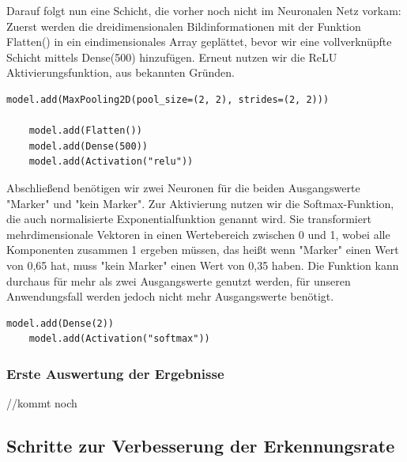 \documentclass[conference]{IEEEtran}
\begin{document}
	Darauf folgt nun eine Schicht, die vorher noch nicht im Neuronalen Netz vorkam:
	Zuerst werden die dreidimensionalen Bildinformationen mit der Funktion Flatten() in ein eindimensionales Array geplättet, bevor wir eine vollverknüpfte Schicht mittels Dense(500) hinzufügen.
	Erneut nutzen wir die ReLU Aktivierungsfunktion, aus bekannten Gründen.
	
	\begin{lstlisting}[label={list:model_1_3},caption=Modell: vierte und fünfte Schicht]
	model.add(MaxPooling2D(pool_size=(2, 2), strides=(2, 2)))
	
	model.add(Flatten())
	model.add(Dense(500))
	model.add(Activation("relu"))
	\end{lstlisting}
	
	Abschließend benötigen wir zwei Neuronen für die beiden Ausgangswerte "Marker" und "kein Marker".
	Zur Aktivierung nutzen wir die Softmax-Funktion, die auch normalisierte Exponentialfunktion genannt wird.
	Sie transformiert mehrdimensionale Vektoren in einen Wertebereich zwischen 0 und 1, wobei alle Komponenten zusammen 1 ergeben müssen, das heißt wenn "Marker" einen Wert von 0,65 hat, muss "kein Marker" einen Wert von 0,35 haben. 
	Die Funktion kann durchaus für mehr als zwei Ausgangswerte genutzt werden, für unseren Anwendungsfall werden jedoch nicht mehr Ausgangswerte benötigt.
	
	\begin{lstlisting}[label={list:model_1_4},caption=Modell: finale sechste Schicht]
	model.add(Dense(2))
	model.add(Activation("softmax"))
	\end{lstlisting}
	
	\subsubsection{Erste Auswertung der Ergebnisse}	%
	//kommt noch
	\subsection{Schritte zur Verbesserung der Erkennungsrate} %
	
\end{document}
